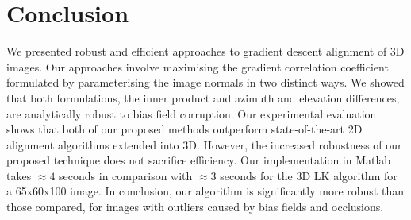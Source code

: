 \section{Conclusion}\label{sec:conclusion}
We presented robust and efficient approaches to gradient descent alignment of 3D images. Our approaches involve maximising the gradient correlation coefficient formulated by parameterising the image normals in two distinct ways. We showed that both formulations, the inner product and azimuth and elevation differences, are analytically robust to bias field corruption. Our experimental evaluation shows that both of our proposed methods outperform state-of-the-art 2D alignment algorithms extended into 3D. However, the increased robustness of our proposed technique does not sacrifice efficiency. Our implementation in Matlab takes $\approx 4$ seconds in comparison with $\approx 3$ seconds for the 3D LK algorithm for a 65x60x100 image. In conclusion, our algorithm is significantly more robust than those compared, for images with outliers caused by bias fields and occlusions.
